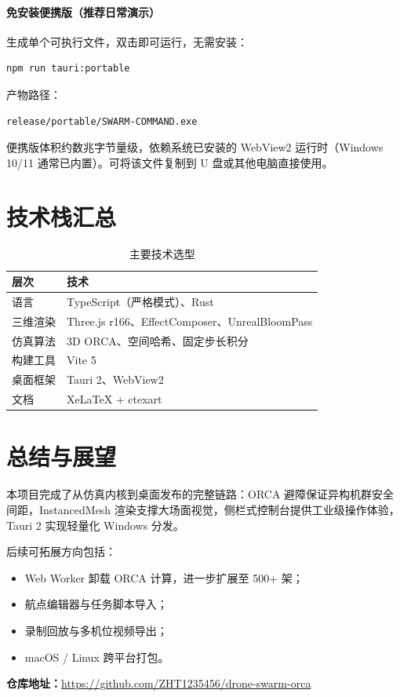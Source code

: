 \documentclass[UTF8,a4paper,11pt]{ctexart}
\begin{document}
\paragraph{免安装便携版（推荐日常演示）}
生成单个可执行文件，双击即可运行，无需安装：
\begin{lstlisting}[language=bash]
npm run tauri:portable
\end{lstlisting}
产物路径：
\begin{lstlisting}[language=bash]
release/portable/SWARM-COMMAND.exe
\end{lstlisting}
便携版体积约数兆字节量级，依赖系统已安装的 WebView2 运行时（Windows 10/11 通常已内置）。可将该文件复制到 U 盘或其他电脑直接使用。

\section{技术栈汇总}

\begin{table}[htbp]
  \centering
  \caption{主要技术选型}
  \begin{tabular}{ll}
    \toprule
    层次 & 技术 \\
    \midrule
    语言 & TypeScript（严格模式）、Rust \\
    三维渲染 & Three.js r166、EffectComposer、UnrealBloomPass \\
    仿真算法 & 3D ORCA、空间哈希、固定步长积分 \\
    构建工具 & Vite 5 \\
    桌面框架 & Tauri 2、WebView2 \\
    文档 & XeLaTeX + ctexart \\
    \bottomrule
  \end{tabular}
\end{table}

\section{总结与展望}

本项目完成了从仿真内核到桌面发布的完整链路：ORCA 避障保证异构机群安全间距，InstancedMesh 渲染支撑大场面视觉，侧栏式控制台提供工业级操作体验，Tauri 2 实现轻量化 Windows 分发。

后续可拓展方向包括：
\begin{itemize}[leftmargin=2em]
  \item Web Worker 卸载 ORCA 计算，进一步扩展至 500+ 架；
  \item 航点编辑器与任务脚本导入；
  \item 录制回放与多机位视频导出；
  \item macOS / Linux 跨平台打包。
\end{itemize}

\vspace{1em}
\noindent\textbf{仓库地址：}\url{https://github.com/ZHT1235456/drone-swarm-orca}
\end{document}
